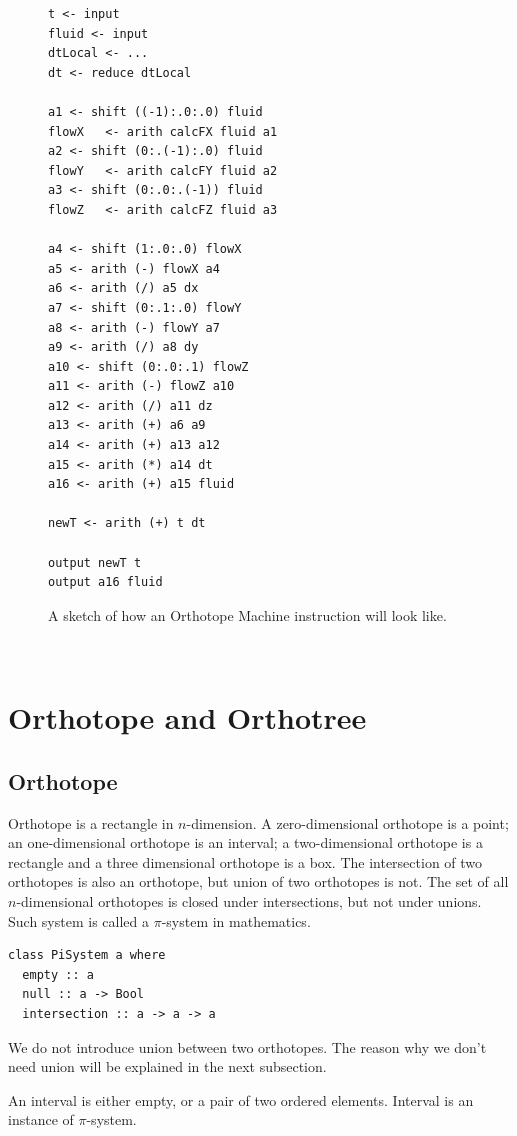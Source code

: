 \documentclass[twocolumn]{article}
\begin{document}
\begin{figure}
\begin{verbatim}
t <- input 
fluid <- input
dtLocal <- ...
dt <- reduce dtLocal

a1 <- shift ((-1):.0:.0) fluid
flowX   <- arith calcFX fluid a1
a2 <- shift (0:.(-1):.0) fluid
flowY   <- arith calcFY fluid a2
a3 <- shift (0:.0:.(-1)) fluid
flowZ   <- arith calcFZ fluid a3

a4 <- shift (1:.0:.0) flowX
a5 <- arith (-) flowX a4
a6 <- arith (/) a5 dx
a7 <- shift (0:.1:.0) flowY
a8 <- arith (-) flowY a7
a9 <- arith (/) a8 dy
a10 <- shift (0:.0:.1) flowZ
a11 <- arith (-) flowZ a10
a12 <- arith (/) a11 dz
a13 <- arith (+) a6 a9
a14 <- arith (+) a13 a12
a15 <- arith (*) a14 dt
a16 <- arith (+) a15 fluid

newT <- arith (+) t dt

output newT t
output a16 fluid
\end{verbatim}
  \caption{A sketch of how an Orthotope Machine instruction will look
    like.}\label{FigureOMInst}
\end{figure}

\newpage
~
\newpage
~
\clearpage


\section{Orthotope and Orthotree}
\label{SectionOrthotope}
\subsection{Orthotope}

Orthotope is a rectangle in $n$-dimension. A zero-dimensional orthotope is a
point; an one-dimensional orthotope is an interval; a two-dimensional
orthotope is a rectangle and a three dimensional orthotope is a box. The
intersection of two orthotopes is also an orthotope, but union of two
orthotopes is not. The set of all $n$-dimensional orthotopes is closed under
intersections, but not under unions. Such system is called a $\pi$-system in
mathematics.

\begin{verbatim}
class PiSystem a where
  empty :: a
  null :: a -> Bool
  intersection :: a -> a -> a
\end{verbatim}

We do not introduce union between two orthotopes. The reason why we don't need
union will be explained in the next subsection.

An interval is either empty, or a pair of two ordered elements. Interval is an
instance of $\pi$-system.
\end{document}
